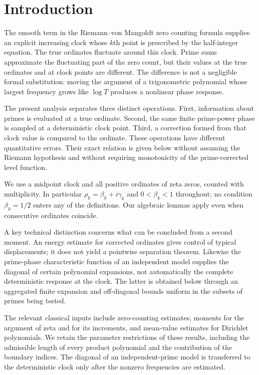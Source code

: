 \documentclass[11pt,reqno]{amsart}
\numberwithin{equation}{section}
\begin{document}
\section{Introduction}
The smooth term in the Riemann--von Mangoldt zero counting formula supplies an explicit increasing clock whose $k$th point is prescribed by the half-integer equation. The true ordinates fluctuate around this clock. Prime sums approximate the fluctuating part of the zero count, but their values at the true ordinates and at clock points are different. The difference is not a negligible formal substitution: moving the argument of a trigonometric polynomial whose largest frequency grows like $\log T$ produces a nonlinear phase response.

The present analysis separates three distinct operations. First, information about primes is evaluated at a true ordinate. Second, the same finite prime-power phase is sampled at a deterministic clock point. Third, a correction formed from that clock value is compared to the ordinate. These operations have different quantitative errors. Their exact relation is given below without assuming the Riemann hypothesis and without requiring monotonicity of the prime-corrected level function.

We use a midpoint clock and all positive ordinates of zeta zeros, counted with multiplicity. In particular $\rho_k=\beta_k+i\gamma_k$ and $0<\beta_k<1$ throughout; no condition $\beta_k=1/2$ enters any of the definitions. Our algebraic lemmas apply even when consecutive ordinates coincide.

A key technical distinction concerns what can be concluded from a second moment. An energy estimate for corrected ordinates gives control of typical displacements; it does not yield a pointwise separation theorem. Likewise the prime-phase characteristic function of an independent model supplies the diagonal of certain polynomial expansions, not automatically the complete deterministic response at the clock. The latter is obtained below through an aggregated finite expansion and off-diagonal bounds uniform in the subsets of primes being tested.

The relevant classical inputs include zero-counting estimates, moments for the argument of zeta and for its increments, and mean-value estimates for Dirichlet polynomials. We retain the parameter restrictions of these results, including the admissible length of every product polynomial and the contribution of the boundary indices. The diagonal of an independent-prime model is transferred to the deterministic clock only after the nonzero frequencies are estimated.
\end{document}
